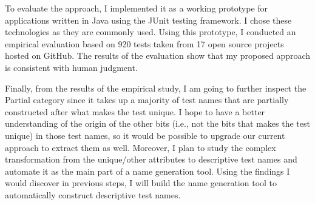 To evaluate the approach, I implemented it as a working prototype for applications written in Java using the JUnit testing framework.
%
I chose these technologies as they are commonly used.
%
Using this prototype, I conducted an empirical evaluation based on \num{920} tests taken from \num{17} open source projects hosted on GitHub.
%
The results of the evaluation show that my proposed approach is consistent with human judgment.


Finally, from the results of the empirical study, I am going to further inspect the Partial category since it takes up a majority of test names that are partially constructed after what makes the test unique.
%
I hope to have a better understanding of the origin of the other bits (i.e., not the bits that makes the test unique) in those test names, so it would be possible to upgrade our current approach to extract them as well.
%
Moreover, I plan to study the complex transformation from the unique\slash other attributes to descriptive test names and automate it as the main part of a name generation tool.
%
Using the findings I would discover in previous steps, I will build the name generation tool to automatically construct descriptive test names.